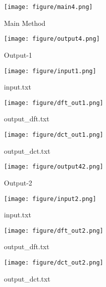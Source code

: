 \documentclass[twoside,11pt]{article}
\begin{document}
\begin{figure}[h]
\caption{Main Method}
\centering
\texttt{[image: figure/main4.png]}
\end{figure}

\begin{figure}[h]
\caption{Output-1}
\centering
\texttt{[image: figure/output4.png]}
\end{figure}

\begin{figure}[h]
\caption{input.txt}
\centering
\texttt{[image: figure/input1.png]}
\end{figure}

\begin{figure}[h]
\caption{output\_dft.txt}
\centering
\texttt{[image: figure/dft\_out1.png]}
\end{figure}

\begin{figure}[h]
\caption{output\_dct.txt}
\centering
\texttt{[image: figure/dct\_out1.png]}
\end{figure}

\begin{figure}[h]
\caption{Output-2}
\centering
\texttt{[image: figure/output42.png]}
\end{figure}

\begin{figure}[h]
\caption{input.txt}
\centering
\texttt{[image: figure/input2.png]}
\end{figure}

\begin{figure}[h]
\caption{output\_dft.txt}
\centering
\texttt{[image: figure/dft\_out2.png]}
\end{figure}

\begin{figure}[h]
\caption{output\_dct.txt}
\centering
\texttt{[image: figure/dct\_out2.png]}
\end{figure}
\end{document}
